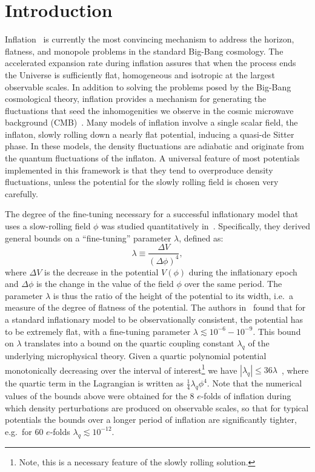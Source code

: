 \documentclass[aps,prd,twocolumn,amssymb,amsmath,floatfix,nofootinbib,superscriptaddress,preprintnumbers]{revtex4-1}
\begin{document}
\section{Introduction}

Inflation~\cite{Guth:1980zm,Linde:1981mu, Albrecht:1982wi,Kazanas:1980tx, Starobinsky:1980te, Sato:1981ds, Sato:1980yn, Mukhanov:1981xt, Linde:1983gd,Mukhanov:2003xw} is currently the most convincing mechanism to address the horizon, flatness, and monopole problems in the standard Big-Bang cosmology. The accelerated expansion rate during inflation assures that when the process ends the Universe is sufficiently flat, homogeneous and isotropic at the largest observable scales. In addition to solving the problems posed by the Big-Bang cosmological theory, inflation provides a mechanism for generating the fluctuations that seed the inhomogenities we observe in the cosmic microwave background (CMB)~\cite{Planck:2018nkj}. Many models of inflation involve a single scalar field, the inflaton, slowly rolling down a nearly flat potential, inducing a quasi-de Sitter phase. In these models, the density fluctuations are adiabatic and originate from the quantum fluctuations of the inflaton. A universal feature of most potentials implemented in this framework is that they tend to overproduce density fluctuations, unless the potential for the slowly rolling field is chosen very carefully.

The degree of the fine-tuning necessary for a successful  inflationary model that uses a slow-rolling field $\phi$ was studied quantitatively in~\cite{Adams:1990pn}. Specifically, they derived general bounds on a ``fine-tuning'' parameter $\lambda$, defined as:
\begin{equation}
    \lambda \equiv \frac{\Delta V}{(\Delta \phi)^4}, \label{eq:1.1}
\end{equation}
where $\Delta V$ is the decrease in the potential $V(\phi)$ during the inflationary epoch and $\Delta \phi$ is the change in the value of the field $\phi$ over the same period. The parameter $\lambda$ is thus the ratio of the height of the potential to its width, i.e.\ a measure of the degree of flatness of the potential. The authors in~\cite{Adams:1990pn} found that for a standard inflationary model to be observationally consistent, the potential has to be extremely flat, with a fine-tuning parameter $\lambda\lesssim 10^{-6}-10^{-9}$. This bound on $\lambda$ translates into a bound on the quartic coupling constant $\lambda_q$ of the underlying microphysical theory. Given a quartic polynomial potential monotonically decreasing over the interval of interest\footnote{Note, this is a necessary feature of the slowly rolling solution.} we have $|\lambda_q|\leq 36 \lambda$~\cite{Adams:1990pn}, where the quartic term in the Lagrangian is written as $\frac{1}{4}\lambda_q\phi^4$. Note that the numerical values of the bounds above were obtained for the 8 $e$-folds of inflation during which density perturbations are produced on observable scales, so that for typical potentials the bounds over a longer period of inflation are significantly tighter, e.g.\ for 60 $e$-folds $\lambda_q\lesssim 10^{-12}$.
\end{document}
